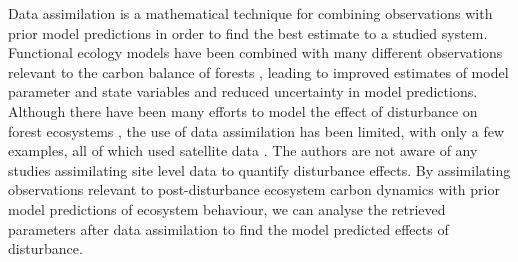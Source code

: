 \documentclass[draft,linenumbers]{agujournal}
\begin{document}
Data assimilation is a mathematical technique for combining observations with prior model predictions in order to find the best estimate to a studied system. Functional ecology models have been combined with many different observations relevant to the carbon balance of forests \citep{zobitz2011primer, fox2009reflex, richardson2010estimating, Quaife2008, Zobitz2014, Niu2014}, leading to improved estimates of model parameter and state variables and reduced uncertainty in model predictions. Although there have been many efforts to model the effect of disturbance on forest ecosystems \citep{seidl2011modelling, thornton2002modeling}, the use of data assimilation has been limited, with only a few examples, all of which used satellite data \citep{kantzas2015improving, hilker2009new}. The authors are not aware of any studies assimilating site level data to quantify disturbance effects. By assimilating observations relevant to post-disturbance ecosystem carbon dynamics with prior model predictions of ecosystem behaviour, we can analyse the retrieved parameters after data assimilation to find the model predicted effects of disturbance.   
\end{document}
